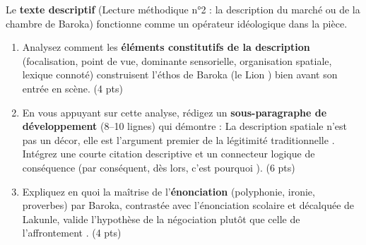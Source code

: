 \documentclass[11pt]{article}
\begin{document}
\begin{exercice}
Le \textbf{texte descriptif} (Lecture méthodique n°2 : la description du marché ou de la chambre de Baroka) fonctionne comme un opérateur idéologique dans la pièce.

\begin{enumerate}
    \item Analysez comment les \textbf{éléments constitutifs de la description} (focalisation, point de vue, dominante sensorielle, organisation spatiale, lexique connoté) construisent l'éthos de Baroka (le \og Lion \fg{}) bien avant son entrée en scène. (4 pts)
    \item En vous appuyant sur cette analyse, rédigez un \textbf{sous-paragraphe de développement} (8--10 lignes) qui démontre : \og La description spatiale n'est pas un décor, elle est l'argument premier de la légitimité traditionnelle \fg{}. Intégrez une courte citation descriptive et un connecteur logique de conséquence (\og par conséquent, dès lors, c'est pourquoi \fg{}). (6 pts)
    \item Expliquez en quoi la maîtrise de l'\textbf{énonciation} (polyphonie, ironie, proverbes) par Baroka, contrastée avec l'énonciation scolaire et décalquée de Lakunle, valide l'hypothèse de la \og négociation \fg{} plutôt que celle de l'\og affrontement \fg{}. (4 pts)
\end{enumerate}
\end{exercice}
\end{document}
